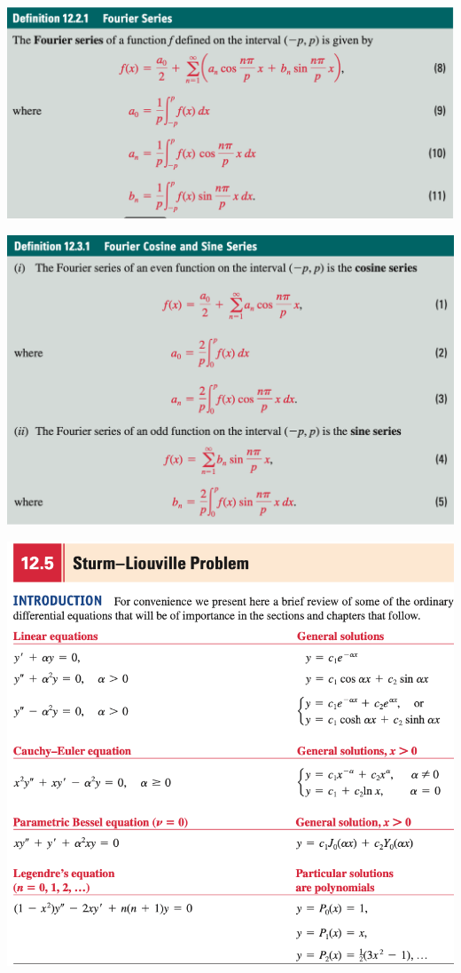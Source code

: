 \documentclass[a4paper,12pt]{article}
\begin{document}
\begin{center}
    \includegraphics[scale=0.35]{images/Fourier.png}
\end{center}
\begin{center}
    \includegraphics[scale=0.3]{images/Sin-Cosin.png}
\end{center}
\begin{center}
    \includegraphics[scale=0.5]{images/Ordinary.png}
\end{center}
\end{document}
